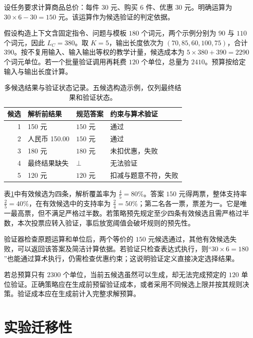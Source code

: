 \documentclass[../textbook.tex]{subfiles}
\begin{document}
\begin{example}


设任务要求计算商品总价：每件 $30$ 元、购买 $6$ 件、优惠 $30$ 元。明确运算为 $30\times6-30=150$ 元。该运算作为候选验证的判定依据。

假设构造上下文含固定指令、问题与模板 $180$ 个词元，两个示例分别为 $90$ 与 $110$ 个词元，因此 $L_C=380$。取 $K=5$，输出长度依次为 $(70,85,60,100,75)$，合计 $390$。按不复用输入、输入输出等权的教学计量，候选成本为 $5\times380+390=2290$ 个词元单位。若一个批量验证调用再耗费 $120$ 个单位，总量为 $2410$。预算按给定输入与输出长度计算。

\begin{table}[htbp]
\centering
\caption[多候选结果与验证状态记录]{多候选结果与验证状态记录。五候选构造示例，仅列最终结果和验证状态。}\label{tab:context-learning-candidates}
\begin{tabularx}{\linewidth}{@{}rllX@{}}
\toprule
候选 & 解析前结果 & 规范答案 & 约束与算术验证\\
\midrule
1 & 150 元 & $150$ 元 & 通过\\
2 & 人民币 150.00 & $150$ 元 & 通过\\
3 & 180 元 & $180$ 元 & 未扣优惠，失败\\
4 & 最终结果缺失 & $\bot$ & 无法验证\\
5 & 120 元 & $120$ 元 & 扣减与题意不符，失败\\
\bottomrule
\end{tabularx}
\end{table}

表\ref{tab:context-learning-candidates}中有效候选为四条，解析覆盖率为 $\frac{4}{5}=80\%$。答案 $150$ 元得两票，整体支持率 $\frac{2}{5}=40\%$，在有效候选中的支持率为 $\frac{2}{4}=50\%$；第二名各一票，票差为一。它是唯一最高票，但不满足严格过半数。若策略预先规定至少四条有效候选且需严格过半数，本次投票应转入验证，事后放宽阈值会破坏规则的预先性。

验证器检查原题运算和单位后，两个等价的 $150$ 元候选通过，其他有效候选失败，可以返回该答案及简洁计算依据。若验证只检查表达式执行，则“$30\times6=180$”也能通过算术执行，仍需检查优惠约束；这说明验证定义直接决定选择结果。

若总预算只有 $2300$ 个单位，当前五候选虽然可以生成，却无法完成预定的 $120$ 单位验证。正确策略应在生成前预留验证成本，或者采用不同候选上限并按其规则决策。验证成本应在生成前计入完整求解预算。
\end{example}

\section{实验迁移性}
\end{document}
